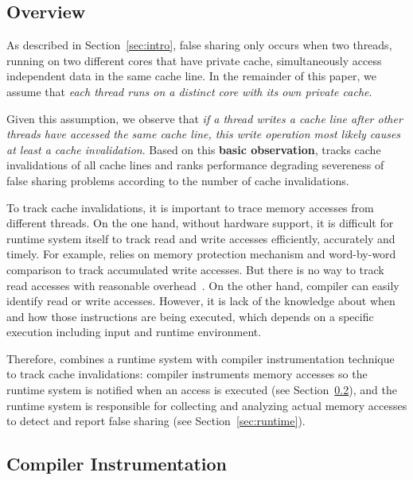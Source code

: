 \label{sec:detection}

\subsection{Overview}
\label{sec:overview}
As described in Section~\ref{sec:intro}, 
false sharing only occurs when two threads, running on two different cores that have private cache,
simultaneously access independent data in the same cache line.
In the remainder of this paper, we assume that {\it each thread runs on a 
distinct core with its own private cache}. 

Given this assumption, we observe that 
{\it if a thread writes a cache line after other threads have 
accessed the same cache line, this write operation most likely causes at least
a cache invalidation}. 
Based on this \textbf{basic observation}, \Predator{} tracks cache invalidations of all 
cache lines and ranks performance degrading severeness of false sharing problems 
according to the number of cache invalidations. 
 
To track cache invalidations, it is important to trace memory accesses from different 
threads. 
On the one hand, without hardware support, it is difficult for runtime system itself to 
track read and write accesses efficiently, accurately and timely. 
For example, \Sheriff{} relies on memory protection mechanism and word-by-word
comparison to track accumulated write accesses. 
But there is no way to track read accesses with  
reasonable overhead~\cite{sheriff}. 
On the other hand, compiler can easily identify  
read or write accesses. However,
it is lack of the knowledge about when and how those instructions are being executed, 
which depends on a specific execution including input and runtime environment. 

Therefore, \Predator{} combines a runtime system with compiler instrumentation technique to track
cache invalidations: compiler instruments memory accesses so the runtime
system is notified when an access is executed (see Section~\ref{sec:compiler}),
and the runtime system is responsible for collecting and analyzing actual memory accesses 
to detect and report false sharing (see Section~\ref{sec:runtime}).

\subsection{Compiler Instrumentation}
\label{sec:compiler}

